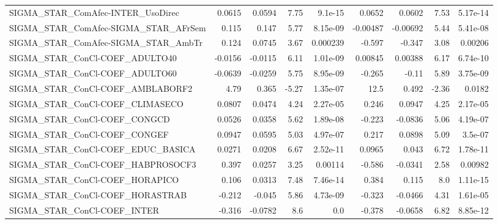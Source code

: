 \begin{tabular}{lrrrrrrrr}
SIGMA\_STAR\_ComAfec-INTER\_UsoDirec      &      0.0615 &       0.0594 &    7.75 &  9.1e-15 &     0.0652 &      0.0602 &         7.53 &      5.17e-14 \\
SIGMA\_STAR\_ComAfec-SIGMA\_STAR\_AFrSem   &       0.115 &        0.147 &    5.77 & 8.15e-09 &   -0.00487 &    -0.00692 &         5.44 &      5.41e-08 \\
SIGMA\_STAR\_ComAfec-SIGMA\_STAR\_AmbTr    &       0.124 &       0.0745 &    3.67 & 0.000239 &     -0.597 &      -0.347 &         3.08 &       0.00206 \\
SIGMA\_STAR\_ConCl-COEF\_ADULTO40         &     -0.0156 &      -0.0115 &    6.11 & 1.01e-09 &    0.00845 &     0.00388 &         6.17 &      6.74e-10 \\
SIGMA\_STAR\_ConCl-COEF\_ADULTO60         &     -0.0639 &      -0.0259 &    5.75 & 8.95e-09 &     -0.265 &       -0.11 &         5.89 &      3.75e-09 \\
SIGMA\_STAR\_ConCl-COEF\_AMBLABORF2       &        4.79 &        0.365 &   -5.27 & 1.35e-07 &       12.5 &       0.492 &        -2.36 &        0.0182 \\
SIGMA\_STAR\_ConCl-COEF\_CLIMASECO        &      0.0807 &       0.0474 &    4.24 & 2.27e-05 &      0.246 &      0.0947 &         4.25 &      2.17e-05 \\
SIGMA\_STAR\_ConCl-COEF\_CONGCD           &      0.0526 &       0.0358 &    5.62 & 1.89e-08 &     -0.223 &     -0.0836 &         5.06 &      4.19e-07 \\
SIGMA\_STAR\_ConCl-COEF\_CONGEF           &      0.0947 &       0.0595 &    5.03 & 4.97e-07 &      0.217 &      0.0898 &         5.09 &       3.5e-07 \\
SIGMA\_STAR\_ConCl-COEF\_EDUC\_BASICA      &      0.0271 &       0.0208 &    6.67 & 2.52e-11 &     0.0965 &       0.043 &         6.72 &      1.78e-11 \\
SIGMA\_STAR\_ConCl-COEF\_HABPROSOCF3      &       0.397 &       0.0257 &    3.25 &  0.00114 &     -0.586 &     -0.0341 &         2.58 &       0.00982 \\
SIGMA\_STAR\_ConCl-COEF\_HORAPICO         &       0.106 &       0.0313 &    7.48 & 7.46e-14 &      0.384 &       0.115 &          8.0 &      1.11e-15 \\
SIGMA\_STAR\_ConCl-COEF\_HORASTRAB        &      -0.212 &       -0.045 &    5.86 & 4.73e-09 &     -0.323 &     -0.0466 &         4.31 &      1.61e-05 \\
SIGMA\_STAR\_ConCl-COEF\_INTER            &      -0.316 &      -0.0782 &     8.6 &      0.0 &     -0.378 &     -0.0658 &         6.82 &      8.85e-12 \\

\end{tabular}
